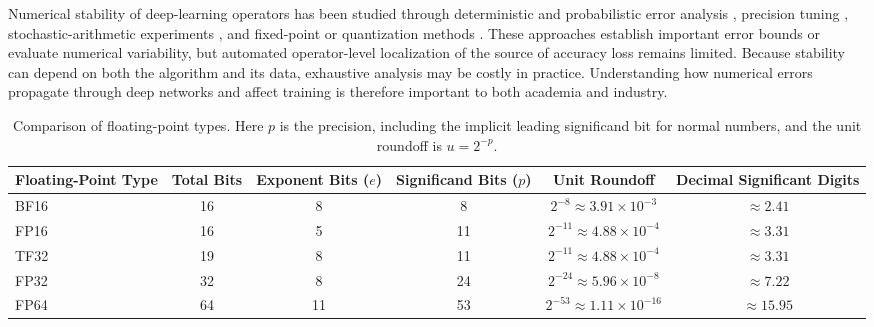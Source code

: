 \documentclass[manuscript, screen]{acmart}
\begin{document}
Numerical stability of deep-learning operators has been studied through deterministic and probabilistic error analysis \cite{budzinskiy20, 10.1093/imanum/draf130, arar2025mixedprecisionaccumulationneural}, precision tuning \cite{ferro2022neural, ioualalen2019precision, lauter2020framework}, stochastic-arithmetic experiments \cite{faraone2019montecarlo, pepe2026fuzzy}, and fixed-point or quantization methods \cite{khalifa2024fixedpoint, lohar2023sound, gernigon2024adaqat}. These approaches establish important error bounds or evaluate numerical variability, but automated operator-level localization of the source of accuracy loss remains limited. Because stability can depend on both the algorithm and its data, exhaustive analysis may be costly in practice. Understanding how numerical errors propagate through deep networks and affect training is therefore important to both academia and industry.


\begin{table}[ht]
\centering\small
\setlength{\tabcolsep}{4pt}
\caption{Comparison of floating-point types. Here $p$ is the precision, including the implicit leading significand bit for normal numbers, and the unit roundoff is $u=2^{-p}$. %
}
\label{tab:ftp}
\begin{tabular}{l c c c c c}
\toprule
Floating-Point Type
& Total Bits
& Exponent Bits ($e$)
& Significand Bits ($p$)
& Unit Roundoff
& Decimal Significant Digits \\
\midrule
BF16
& 16 & 8 & 8
& $2^{-8} \approx 3.91 \times 10^{-3}$
& $\approx 2.41$ \\

FP16
& 16 & 5 & 11
& $2^{-11} \approx 4.88 \times 10^{-4}$
& $\approx 3.31$ \\

TF32
& 19 & 8 & 11
& $2^{-11} \approx 4.88 \times 10^{-4}$
& $\approx 3.31$ \\

FP32
& 32 & 8 & 24
& $2^{-24} \approx 5.96 \times 10^{-8}$
& $\approx 7.22$ \\

FP64
& 64 & 11 & 53
& $2^{-53} \approx 1.11 \times 10^{-16}$
& $\approx 15.95$ \\
\bottomrule
\end{tabular}
\end{table}
\end{document}
